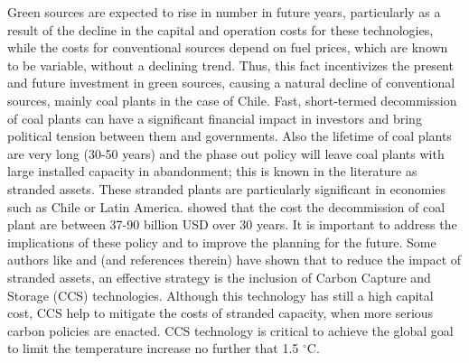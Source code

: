 \documentclass[11pt, letterpaper]{article}
\begin{document}
Green sources are expected to rise in number in future years, particularly as a result of the decline in the capital and operation costs for these technologies, while the costs for conventional sources depend on fuel prices, which are known to be variable, without a declining trend. Thus, this fact incentivizes the present and future investment in green sources, causing a natural decline of conventional sources, mainly coal plants in the case of Chile. Fast, short-termed decommission of coal plants can have a significant financial impact in investors and bring political tension between them and governments. Also the lifetime of coal plants are very long (30-50 years) and the phase out policy will leave coal plants with large installed capacity in abandonment; this is known in the literature as stranded assets. These stranded plants are particularly significant in economies such as Chile or Latin America. \cite{feijoo2019Stranded} showed that the cost the decommission of coal plant are between 37-90 billion USD over 30 years. It is important to address the implications of these policy and to improve the planning for the future. Some authors like \cite{Johnson2015} and \cite{Clark2014} (and references therein) have shown that to reduce the impact of stranded assets, an effective strategy is the inclusion of Carbon Capture and Storage (CCS) technologies. Although this technology has still a high capital cost, CCS help to mitigate the costs of stranded capacity, when more serious carbon policies are enacted. CCS technology is critical to achieve the global goal to limit the temperature increase no further that 1.5 $^{\circ}$C.
\end{document}
